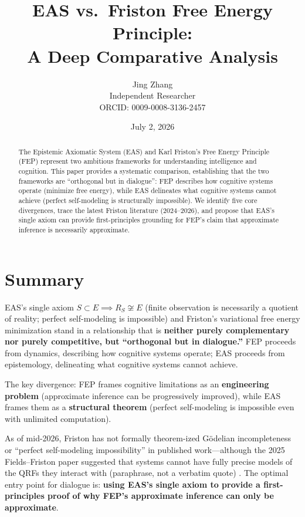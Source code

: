 \documentclass[11pt,a4paper]{article}
\title{\textbf{EAS vs.\ Friston Free Energy Principle:\\A Deep Comparative Analysis}}
\author{Jing Zhang\\[4pt]
\small Independent Researcher\\
\small ORCID: 0009-0008-3136-2457}
\date{July 2, 2026}
\begin{document}
\maketitle

\begin{abstract}
The Epistemic Axiomatic System (EAS) and Karl Friston's Free Energy Principle (FEP) represent two ambitious frameworks for understanding intelligence and cognition. This paper provides a systematic comparison, establishing that the two frameworks are ``orthogonal but in dialogue'': FEP describes how cognitive systems operate (minimize free energy), while EAS delineates what cognitive systems cannot achieve (perfect self-modeling is structurally impossible). We identify five core divergences, trace the latest Friston literature (2024--2026), and propose that EAS's single axiom can provide first-principles grounding for FEP's claim that approximate inference is necessarily approximate.
\end{abstract}

\tableofcontents
\newpage

\section{Summary}

EAS's single axiom $S \subset E \implies R_S \not\cong E$ (finite observation is necessarily a quotient of reality; perfect self-modeling is impossible) and Friston's variational free energy minimization stand in a relationship that is \textbf{neither purely complementary nor purely competitive, but ``orthogonal but in dialogue.''} FEP proceeds from dynamics, describing how cognitive systems operate; EAS proceeds from epistemology, delineating what cognitive systems cannot achieve.

The key divergence: FEP frames cognitive limitations as an \textbf{engineering problem} (approximate inference can be progressively improved), while EAS frames them as a \textbf{structural theorem} (perfect self-modeling is impossible even with unlimited computation).

As of mid-2026, Friston has not formally theorem-ized G\"{o}delian incompleteness or ``perfect self-modeling impossibility'' in published work---although the 2025 Fields--Friston paper suggested that systems cannot have fully precise models of the QRFs they interact with (paraphrase, not a verbatim quote) \cite{fields2025}. The optimal entry point for dialogue is: \textbf{using EAS's single axiom to provide a first-principles proof of why FEP's approximate inference can only be approximate}.
\end{document}
